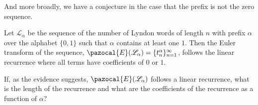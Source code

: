And more broadly, we have a conjecture in the case that the prefix is not the
zero sequence.
\begin{conjecture}
  Let $\mathcal{L}_\alpha$ be the sequence of the
  number of Lyndon words of length $n$ with prefix $\alpha$ over the alphabet
  $\{0,1\}$ such that $\alpha$ contains at least one $1$.
  Then the Euler transform of the sequence,
  $\pazocal{E}(\mathcal{L_\alpha}) = \{t_{n}^\alpha\}_{n=1}^\infty$,
  follows the linear recurrence where all terms have coefficients of $0$ or $1$.
\end{conjecture}

\begin{openquestion}
  If, as the evidence suggests, $\pazocal{E}(\mathcal{L_\alpha})$ follows a
  linear recurrence,
  what is the length of the recurrence and
  what are the coefficients of the recurrence
  as a function of $\alpha$?
\end{openquestion}





